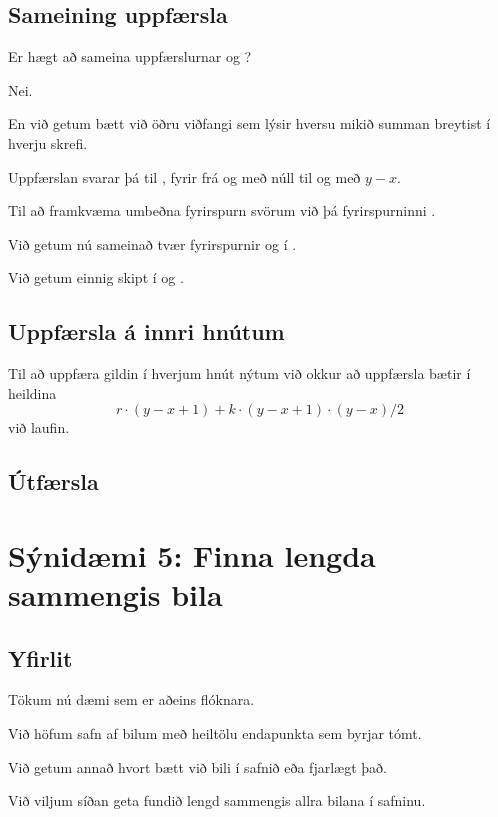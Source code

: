 \subsection{Sameining uppfærsla}
{
    {
        \item<1-> Er hægt að sameina uppfærslurnar  og ?
        \item<2-> Nei.
        \item<3-> En við getum bætt við öðru viðfangi sem lýsir hversu mikið summan breytist í hverju skrefi.
        \item<4-> Uppfærslan  svarar þá til , fyrir  frá og með núll til og með $y - x$.
        \item<5-> Til að framkvæma umbeðna fyrirspurn svörum við þá fyrirspurninni .
        \item<6-> Við getum nú sameinað tvær fyrirspurnir  og  í .
        \item<7-> Við getum einnig skipt  í  og .
    }
}

\subsection{Uppfærsla á innri hnútum}
{
    {
        \item<1-> Til að uppfæra gildin í hverjum hnút nýtum við okkur að uppfærsla  bætir í heildina 
\[
                    r \cdot (y - x + 1) + k \cdot (y - x + 1) \cdot (y - x) / 2
\]
                    við laufin.
    }
}

\subsection{Útfærsla}
{
}

{
}

\section{Sýnidæmi 5: Finna lengda sammengis bila}
\subsection{Yfirlit}
{
    {
        \item<1-> Tökum nú dæmi sem er aðeins flóknara.
        \item<2-> Við höfum safn af bilum með heiltölu endapunkta sem byrjar tómt.
        \item<3-> Við getum annað hvort bætt við bili í safnið eða fjarlægt það.
        \item<4-> Við viljum síðan geta fundið lengd sammengis allra bilana í safninu.
    }
}

